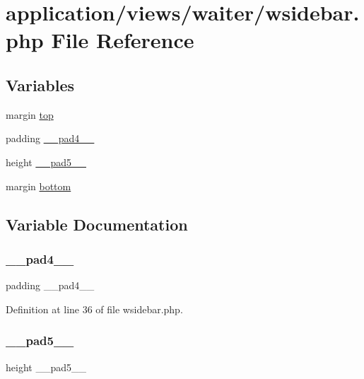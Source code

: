 \hypertarget{wsidebar_8php}{}\section{application/views/waiter/wsidebar.php File Reference}
\label{wsidebar_8php}
\subsection*{Variables}
\begin{DoxyCompactItemize}
\item 
margin \mbox{\hyperlink{wsidebar_8php_a92a4f9c60f5fc724a2e9a4fdb35e9777}{top}}
\item 
padding \mbox{\hyperlink{wsidebar_8php_af63708a040bda6a39094d509725a0c66}{\+\_\+\+\_\+pad4\+\_\+\+\_\+}}
\item 
height \mbox{\hyperlink{wsidebar_8php_af704f374e051d84037482cc1da2df714}{\+\_\+\+\_\+pad5\+\_\+\+\_\+}}
\item 
margin \mbox{\hyperlink{wsidebar_8php_a9034efd9266ed643f35aa86e8ca32ac2}{bottom}}
\end{DoxyCompactItemize}


\subsection{Variable Documentation}
\mbox{\label{wsidebar_8php_af63708a040bda6a39094d509725a0c66}} 
\subsubsection{\texorpdfstring{\_\_pad4\_\_}{\_\_pad4\_\_}}
{\footnotesize\ttfamily padding \+\_\+\+\_\+pad4\+\_\+\+\_\+}



Definition at line 36 of file wsidebar.\+php.

\mbox{\label{wsidebar_8php_af704f374e051d84037482cc1da2df714}} 
\subsubsection{\texorpdfstring{\_\_pad5\_\_}{\_\_pad5\_\_}}
{\footnotesize\ttfamily height \+\_\+\+\_\+pad5\+\_\+\+\_\+}



